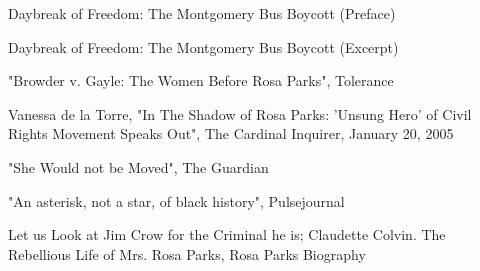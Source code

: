 Daybreak of Freedom: The Montgomery Bus Boycott (Preface)

Daybreak of Freedom: The Montgomery Bus Boycott (Excerpt)

"Browder v. Gayle: The Women Before Rosa Parks", Tolerance

Vanessa de la Torre, "In The Shadow of Rosa Parks: 'Unsung Hero' of
Civil Rights Movement Speaks Out", The Cardinal Inquirer, January 20,
2005

"She Would not be Moved", The Guardian

"An asterisk, not a star, of black history", Pulsejournal

Let us Look at Jim Crow for the Criminal he is; Claudette Colvin. The
Rebellious Life of Mrs. Rosa Parks, Rosa Parks Biography
